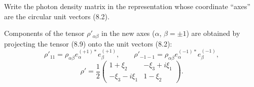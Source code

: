 \begin{center}
\ProblemHeading
\end{center}

Write the photon density matrix in the representation whose coordinate ``axes'' are the circular unit vectors (8.2).

\SolutionHeading Components of the tensor $\rho'_{\alpha\beta}$ in the new axes ($\alpha$, $\beta=\pm1$) are obtained by projecting the tensor (8.9) onto the unit vectors (8.2):
\[
\rho'_{11}=\rho_{\alpha\beta}e_\alpha^{(+1)*}e_\beta^{(+1)},
\qquad
\rho'_{-1-1}=\rho_{\alpha\beta}e_\alpha^{(-1)*}e_\beta^{(-1)},
\]
\[
\rho'=\frac{1}{2}
\begin{pmatrix}
1+\xi_2 & -\xi_3+i\xi_1\\
-\xi_3-i\xi_1 & 1-\xi_2
\end{pmatrix}.
\]
